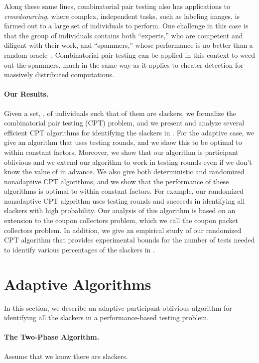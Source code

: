 \documentclass[11pt]{llncs}
\renewcommand{\subsection}[1]{\paragraph{\bf #1.}}
\begin{document}
Along these same lines,
combinatorial pair testing also has applications to 
\emph{crowdsourcing}, where complex, independent tasks, such as labeling 
images, is farmed out to a large set of individuals to perform.
One challenge in this case is that the group of individuals contains 
both ``experts,''
who are competent and diligent with their work, and ``spammers,''
whose performance is no better than a random oracle~\cite{NIPS2012_0328}.
Combinatorial pair testing can be applied in this context to weed
out the spammers, much in the same way
as it applies to cheater detection for massively distributed computations.

\subsection{Our Results}
Given a set, , of  individuals such that  of them 
are slackers,
we formalize the combinatorial pair testing (CPT) problem,
and we present and analyze several efficient CPT algorithms for identifying
the slackers in .
For the adaptive case, we give an algorithm that uses 
 testing rounds, and we show this to be optimal to within constant factors.
Moreover, we show that our algorithm is participant oblivious
and we extend our algorithm to work in 
testing rounds even if we don't know the value of 
in advance.
We also give both deterministic and randomized nonadaptive CPT algorithms, 
and we show that the performance of these algorithms is optimal to
within constant factors.
For example, our randomized nonadaptive CPT algorithm uses 
 testing rounds and succeeds in identifying all slackers
with high probability.
Our analysis of this algorithm
is based on an extension to the coupon collectors problem,
which we call the coupon packet collectors problem.
In addition, we give an empirical study of our randomized CPT algorithm that
provides experimental bounds for the number of tests needed to identify various
percentages of the slackers in .

\section{Adaptive Algorithms}
In this section, we describe an adaptive participant-oblivious algorithm for identifying all the slackers in a performance-based testing problem.

\subsection{The Two-Phase Algorithm}
Assume that we know
there are  slackers.
\end{document}
